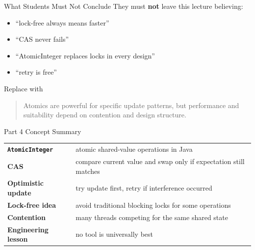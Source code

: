 \documentclass[aspectratio=169,11pt]{beamer}
\begin{document}
	\begin{frame}{What Students Must Not Conclude}
		They must \textbf{not} leave this lecture believing:
		
		\begin{itemize}
			\item ``lock-free always means faster''
			\item ``CAS never fails''
			\item ``AtomicInteger replaces locks in every design''
			\item ``retry is free''
		\end{itemize}
		
		\vspace{0.35cm}
		
		\begin{alertblock}{Replace with}
			\begin{quote}
				Atomics are powerful for specific update patterns, but performance and suitability depend on contention and design structure.
			\end{quote}
		\end{alertblock}
	\end{frame}
	
	\begin{frame}{Part 4 Concept Summary}
		\centering
		\begin{tabular}{>{\bfseries}m{3cm} m{7.1cm}}
			\texttt{AtomicInteger} & atomic shared-value operations in Java \\
			CAS & compare current value and swap only if expectation still matches \\
			Optimistic update & try update first, retry if interference occurred \\
			Lock-free idea & avoid traditional blocking locks for some operations \\
			Contention & many threads competing for the same shared state \\
			Engineering lesson & no tool is universally best \\
		\end{tabular}
	\end{frame}
	
\end{document}
